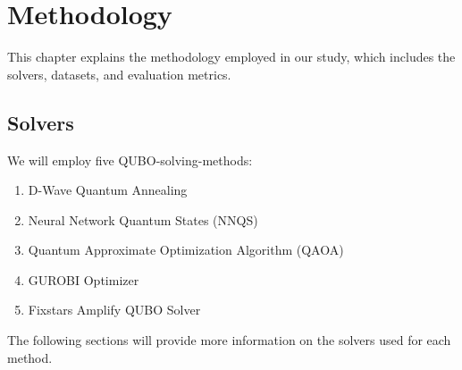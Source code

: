 
\chapter{Methodology}
\label{methodology}
This chapter explains the methodology employed in our study, which includes the solvers, datasets, and evaluation metrics.

\section{Solvers}
We will employ five QUBO-solving-methods:
\begin{enumerate}
    \item D-Wave Quantum Annealing
    \item Neural Network Quantum States (NNQS)
    \item Quantum Approximate Optimization Algorithm (QAOA)
    \item GUROBI Optimizer
    \item Fixstars Amplify QUBO Solver
\end{enumerate}
The following sections will provide more information on the solvers used for each method.

